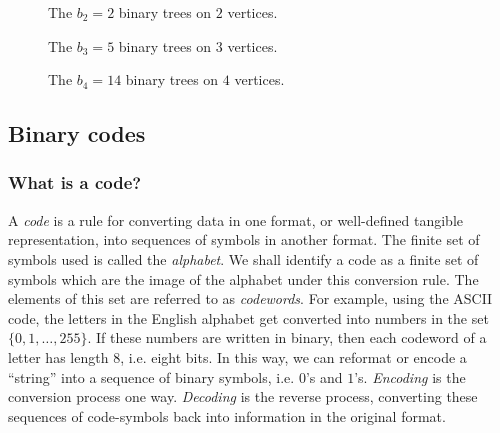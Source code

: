 \begin{figure}[!htbp]
\centering

\caption{The $b_2 = 2$ binary trees on $2$ vertices.}
\label{fig:trees_forests:binary_trees_2_vertices}
\end{figure}

\begin{figure}[!htbp]
\centering

\caption{The $b_3 = 5$ binary trees on $3$ vertices.}
\label{fig:trees_forests:binary_trees_3_vertices}
\end{figure}

\begin{figure}[!htbp]
\centering

\caption{The $b_4 = 14$ binary trees on $4$ vertices.}
\label{fig:trees_forests:binary_trees_4_vertices}
\end{figure}



\subsection{Binary codes}



\subsubsection{What is a code?}

A \emph{code} is a rule for converting data in one format,
or well-defined tangible representation, into sequences of symbols in
another format. The finite set of symbols used is called the
\emph{alphabet}. We shall identify a code as a finite
set of symbols which are the image of the alphabet under this
conversion rule. The elements of this set are referred to as
\emph{codewords}. For example, using the ASCII code,
the letters in the English alphabet get converted into numbers in the
set $\{0, 1, \dots, 255\}$. If these numbers are written in binary,
then each codeword of a letter has length $8$, i.e. eight bits. In
this way, we can reformat or encode a ``string'' into a sequence of
binary symbols, i.e. $0$'s and $1$'s. \emph{Encoding} is
the conversion process one way. \emph{Decoding} is the
reverse process, converting these sequences of code-symbols back into
information in the original format.

